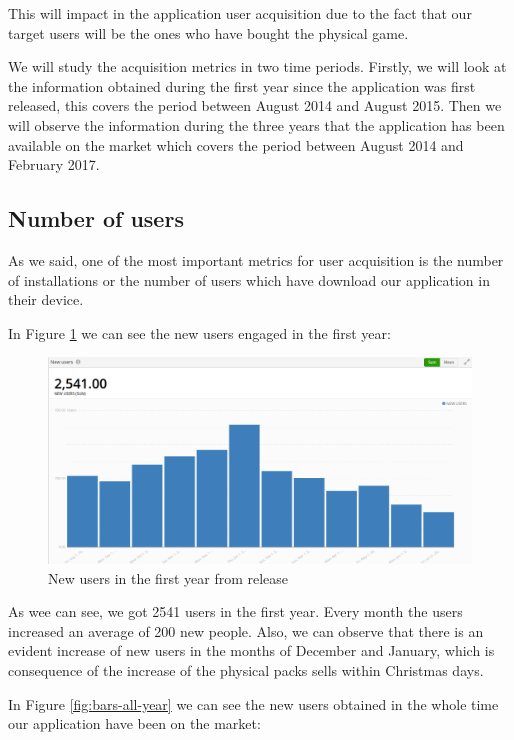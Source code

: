 This will impact in the application user acquisition due to the fact that our target users will be the ones who have bought the physical game.

\FloatBarrier

We will study the acquisition metrics in two time periods. Firstly, we will look at the information obtained during the first year since the application was first released, this covers the period between August 2014 and August 2015. Then we will observe the information during the three years that the application has been available on the market which covers the period between August 2014 and February 2017.

\subsection{Number of users}

As we said, one of the most important metrics for user acquisition is the number of installations or the number of users which have download our application in their device.

In Figure \ref{fig:bars-first-year} we can see the new users engaged in the first year:

\begin{figure}[h]
\centering
\includegraphics[width=350pt]{graphics/evaluation/bars_users_year.png}
\caption{New users in the first year from release}
\label{fig:bars-first-year}
\end{figure}

As wee can see, we got 2541 users in the first year. Every month the users increased an average of 200 new people. Also, we can observe that there is an evident increase of new users in the months of December and January, which is consequence of the increase of the physical packs sells within Christmas days.

In Figure \ref{fig:bars-all-year} we can see the new users obtained in the whole time our application have been on the market:

